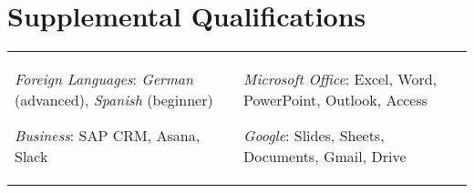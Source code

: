\documentclass[a4paper,10pt]{article}
\begin{document}
\section{Supplemental Qualifications}
\begin{supertabular}{p{8.65cm} p{8.65cm}}
	\begin{enumerate*}[label =$\circ$, itemjoin={\newline}]
		\item \small \emph{Foreign Languages}: \footnotesize \emph{German} (advanced), \emph{Spanish} (beginner)
	 	\item \small \emph{Business}: \footnotesize SAP CRM, Asana, Slack
	\end{enumerate*}

	& \begin{enumerate*}[label =$\circ$, itemjoin={\newline}]
	 	\item \small \emph{Microsoft Office}: \footnotesize Excel, Word, PowerPoint, Outlook, Access
	 	\item \small \emph{Google}: \footnotesize Slides, Sheets, Documents, Gmail, Drive
	\end{enumerate*} \\

\end{supertabular}
\end{document}

